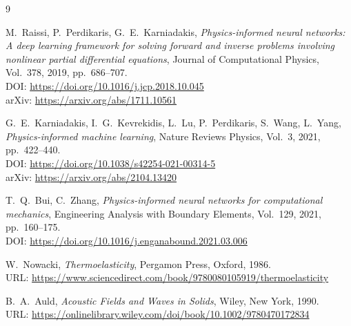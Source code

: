 \documentclass[12pt]{article}
\begin{document}
\begin{thebibliography}{9}

M.~Raissi, P.~Perdikaris, G.~E.~Karniadakis,
\textit{Physics-informed neural networks: A deep learning framework for solving forward and inverse problems involving nonlinear partial differential equations},
Journal of Computational Physics, Vol.~378, 2019, pp.~686--707.\\
DOI: \url{https://doi.org/10.1016/j.jcp.2018.10.045}\\
arXiv: \url{https://arxiv.org/abs/1711.10561}

G.~E.~Karniadakis, I.~G.~Kevrekidis, L.~Lu, P.~Perdikaris, S.~Wang, L.~Yang,
\textit{Physics-informed machine learning},
Nature Reviews Physics, Vol.~3, 2021, pp.~422--440.\\
DOI: \url{https://doi.org/10.1038/s42254-021-00314-5}\\
arXiv: \url{https://arxiv.org/abs/2104.13420}

T.~Q.~Bui, C.~Zhang,
\textit{Physics-informed neural networks for computational mechanics},
Engineering Analysis with Boundary Elements, Vol.~129, 2021, pp.~160--175.\\
DOI: \url{https://doi.org/10.1016/j.enganabound.2021.03.006}

W.~Nowacki,
\textit{Thermoelasticity},
Pergamon Press, Oxford, 1986.\\
URL: \url{https://www.sciencedirect.com/book/9780080105919/thermoelasticity}

B.~A.~Auld,
\textit{Acoustic Fields and Waves in Solids},
Wiley, New York, 1990.\\
URL: \url{https://onlinelibrary.wiley.com/doi/book/10.1002/9780470172834}

\end{thebibliography}
\end{document}
